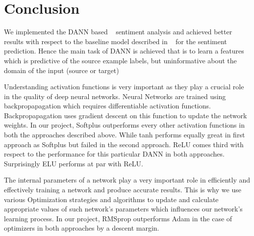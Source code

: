 \documentclass[11pt,a4paper]{article}
\begin{document}
\section{Conclusion}
We implemented the DANN based ~\cite{Ganin:2016} sentiment analysis and achieved better results with respect to the baseline model described in ~\cite{Britz} for the sentiment prediction. Hence the main task of DANN is achieved that is to learn a features which is predictive of the source example labels, but uninformative about the domain of the input (source or target)

Understanding activation functions is very important as they play a crucial role in the quality of deep neural networks. Neural Networks are trained using backpropapagation which requires differentiable activation functions. Backpropapagation uses gradient descent on this function to update the network weights. In our project, Softplus outperforms every other activation functions in both the approaches described above. While tanh performs equally great in first approach as Softplus but failed in the second approach. ReLU comes third with respect to the performance for this particular DANN in both approaches. Surprisingly ELU performs at par with ReLU.

The internal parameters of a network play a very important role in efficiently and effectively training a network and produce accurate results. This is why we use various Optimization strategies and algorithms to update and calculate appropriate values of such network’s parameters which influences our network’s learning process. In our project, RMSprop outperforms Adam in the case of optimizers in both approaches by a descent margin.
%
%
\end{document}
